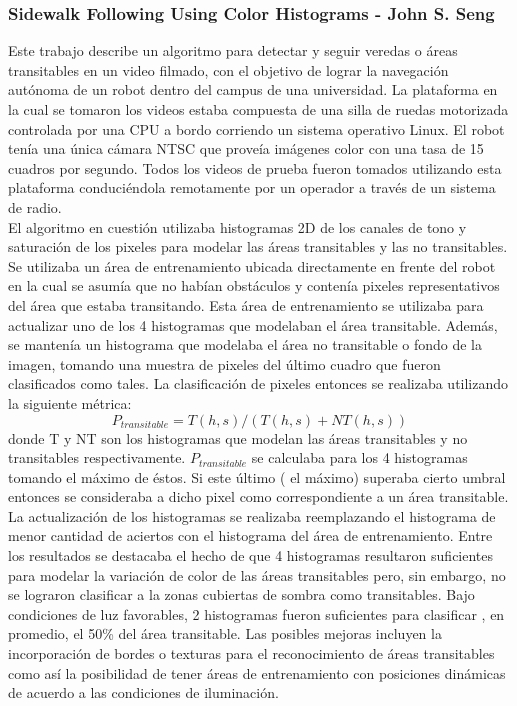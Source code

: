 	\subsubsection{\label{sec:sidewalk} Sidewalk Following Using Color Histograms - John S. Seng}
	Este trabajo describe un algoritmo  para detectar y seguir 
	veredas o \'areas transitables en un video filmado, con el objetivo de 
	lograr la navegaci\'on aut\'onoma de un robot dentro del 
	campus de una universidad. La plataforma en la cual se tomaron los 
	videos estaba 
	compuesta de una silla de ruedas motorizada controlada por una CPU 
	a bordo corriendo un sistema operativo Linux. El robot ten\'ia una 
	\'unica c\'amara NTSC que prove\'ia im\'agenes color con una tasa de 15 
	cuadros por segundo. Todos los videos de prueba fueron tomados 
	utilizando esta plataforma conduci\'endola remotamente por un 
	operador a trav\'es de un sistema de radio.\\
	\indent El algoritmo en cuesti\'on utilizaba histogramas 2D de los 
	canales de tono y saturaci\'on de los pixeles para modelar las \'areas
	transitables y las no transitables. Se utilizaba un \'area de 
	entrenamiento ubicada directamente en frente del robot en la cual se 
	asum\'ia que 
	no hab\'ian obst\'aculos y conten\'ia pixeles representativos del \'area que 
	estaba transitando. Esta \'area de entrenamiento se utilizaba para 
	actualizar uno de los 4 histogramas que modelaban el \'area 
	transitable. Adem\'as, se manten\'ia un histograma que modelaba el
	\'area no transitable o fondo de la imagen, tomando una muestra de pixeles del \'ultimo 
	cuadro que fueron clasificados como tales. La 
	clasificaci\'on de pixeles entonces se realizaba utilizando la 
	siguiente m\'etrica:
	\[
	P_{transitable}= T(h,s)/ ( T(h,s) + NT(h,s))
	\]
	donde T y NT son los histogramas que modelan las \'areas transitables
	y no transitables respectivamente. $P_{transitable}$ se calculaba para 
	los 4 histogramas tomando el m\'aximo de \'estos. Si este \'ultimo ( el 
	m\'aximo) superaba 
	cierto umbral entonces se consideraba a dicho pixel como 
	correspondiente a un \'area transitable.
	La actualizaci\'on de los histogramas se realizaba reemplazando el 
	histograma de menor cantidad de aciertos con el histograma 
	del \'area de entrenamiento.  Entre los resultados se destacaba el 
	hecho de que 4 histogramas resultaron suficientes para modelar la
	variaci\'on de color de las \'areas transitables pero, sin embargo, no 
	se lograron clasificar a la zonas cubiertas de sombra como transitables.
	Bajo condiciones de luz favorables, 2 histogramas fueron 
	suficientes para clasificar , en promedio, el 50\% del \'area 
	transitable. Las posibles mejoras incluyen la incorporaci\'on de 
	bordes o texturas para el reconocimiento de \'areas transitables 
	como as\'i la posibilidad de tener \'areas de entrenamiento con 
	posiciones din\'amicas de acuerdo a las condiciones de iluminaci\'on.
	
